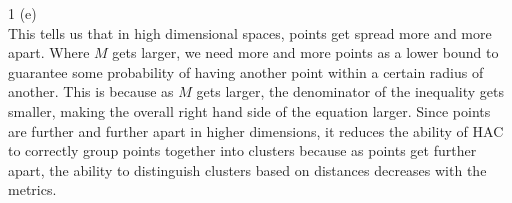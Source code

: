 \documentclass[12pt]{scrartcl}
\begin{document}
1 (e) \\

This tells us that in high dimensional spaces, points get spread more and more apart. Where $M$ gets larger, we need more and more points as a lower bound to guarantee some probability of having another point within a certain radius of another. This is because as $M$ gets larger, the denominator of the inequality gets smaller, making the overall right hand side of the equation larger. Since points are further and further apart in higher dimensions, it reduces the ability of HAC to correctly group points together into clusters because  as points get further apart, the ability to distinguish clusters based on distances decreases with the metrics.
\end{document}

